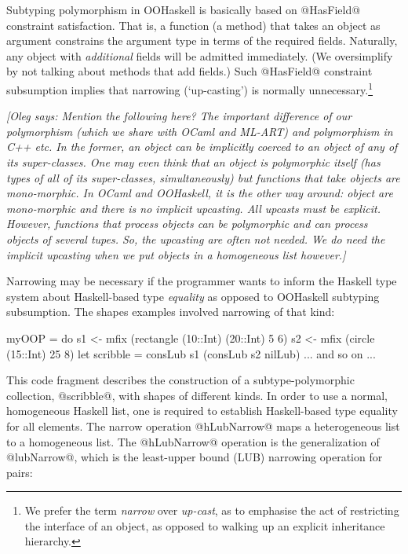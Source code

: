 \documentclass{jfp}
\newcommand{\oleg}[1]{{\it [Oleg says: #1]}}
\begin{document}
Subtyping polymorphism in OOHaskell is basically based on @HasField@
constraint satisfaction. That is, a function (a method) that takes an
object as argument constrains the argument type in terms of the
required fields. Naturally, any object with \emph{additional} fields
will be admitted immediately. (We oversimplify by not talking about
methods that add fields.) Such @HasField@ constraint subsumption
implies that narrowing (`up-casting') is normally
unnecessary.\footnote{We prefer the term
\emph{narrow} over \emph{up-cast}, as to emphasise the act of
restricting the interface of an object, as opposed to walking up an
explicit inheritance hierarchy.}

\oleg{Mention the following here? The important difference of our 
polymorphism (which we share with OCaml and ML-ART) and polymorphism
in C++ etc. In the former, an object can be \emph{implicitly} coerced
to an object of any of its super-classes. One may even think that an
object is polymorphic itself (has types of all of its super-classes,
simultaneously) but functions that take objects are mono-morphic.
In OCaml and OOHaskell, it is the other way around: object are
mono-morphic and there is no implicit upcasting. All upcasts must be
explicit. However, functions that process objects can be polymorphic
and can process objects of several tupes. So, the upcasting are
often not needed. We do need the implicit upcasting when we put
objects in a homogeneous list however.}


Narrowing may be necessary if the programmer wants to inform the
Haskell type system about Haskell-based type
\emph{equality} as opposed to OOHaskell subtyping subsumption. 
The shapes examples involved narrowing of that kind:

\begin{code}
 myOOP = do
            s1 <- mfix (rectangle (10::Int) (20::Int) 5 6)
            s2 <- mfix (circle (15::Int) 25 8)
            let scribble = consLub s1 (consLub s2 nilLub)
            ... and so on ...
\end{code}

This code fragment describes the construction of a subtype-polymorphic
collection, @scribble@, with shapes of different kinds. In order to
use a normal, homogeneous Haskell list, one is required to establish
Haskell-based type equality for all elements. The narrow operation
@hLubNarrow@ maps a heterogeneous list to a homogeneous list. The
@hLubNarrow@ operation is the generalization of @lubNarrow@, which is
the least-upper bound (LUB) narrowing operation for pairs:
\end{document}
